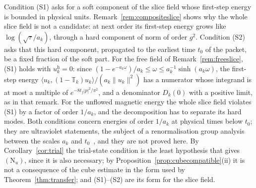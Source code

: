 \documentclass[aps,prd,twocolumn,superscriptaddress,nofootinbib,longbibliography,floatfix,amsmath,amssymb,10pt]{revtex4-2}
\theoremstyle{definition}
\theoremstyle{remark}
\newcommand{\ip}[2]{\langle #1,#2\rangle}
\begin{document}
Condition (S1) asks for a soft component of the slice field whose first-step
energy is bounded in physical units. Remark~\ref{rem:compositeslice} shows why
the whole slice field is not a candidate: at next order its first-step energy
grows like $\log(\sqrt\tau/a_k)$, through a hard component of norm of order
$g^2$. Condition (S2) asks that this hard component, propagated to the
earliest time $t_0$ of the packet, be a fixed fraction of the soft part.
For the free field of Remark~\ref{rem:freeslice}, (S1) holds with
$u^{\mathrm h}_k=0$: since $(1-e^{-a_k\omega})/a_k\le\omega\le
a_k^{-1}\sinh(a_k\omega)$, the first-step energy
$\ip{u_k}{(1-\mathbb T_k)u_k}/(a_k\|u_k\|^2)$ has a numerator whose
integrand is at most a multiple of $e^{-8t_f|p|^2/\pi^2}$, and a denominator $D_k(0)$ with a positive limit, as
in that remark. For the unflowed magnetic energy the whole slice field
violates (S1) by a factor of order $1/a_k$, and the decomposition has to
separate its hard modes. Both conditions concern energies of order $1/a_k$ at
physical times below $t_0$; they are ultraviolet statements, the subject of a
renormalisation group analysis between the scales $a_k$ and
$t_0$~\cite{Bal84a,Bal85a,Bal89b}, and they are not proved here. By
Corollary~\ref{cor:trial} the trial-state condition is the least hypothesis
that gives $(\mathrm N_u)$, since it is also necessary; by
Proposition~\ref{prop:cubecompatible}(ii) it is not a consequence of the cube
estimate in the form used by Theorem~\ref{thm:transfer}; and (S1)--(S2) are
its form for the slice field.
\end{document}
